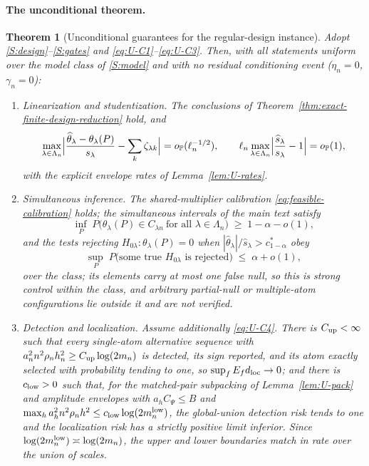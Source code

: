 \documentclass[11pt]{article}
\newtheorem{theorem}{Theorem}[section]
\theoremstyle{definition}
\newcommand{\1}{\mathbf 1}\newcommand{\op}{\operatorname}
\begin{document}
\paragraph{The unconditional theorem.}

\begin{theorem}[Unconditional guarantees for the regular-design instance]
\label{thm:U-unconditional}
Adopt \ref{S:design}--\ref{S:gates} and \eqref{eq:U-C1}--\eqref{eq:U-C3}.
Then, with all statements uniform over the model class of \ref{S:model} and
with no residual conditioning event ($\eta_n=0$, $\gamma_n=0$):
\begin{enumerate}[label=\textup{(\alph*)},leftmargin=2em,itemsep=3pt]
\item\emph{Linearization and studentization.}  The conclusions of
Theorem~\ref{thm:exact-finite-design-reduction} hold, and
\[
\max_{\lambda\in\Lambda_n}
\Bigl|\frac{\widehat\theta_\lambda-\theta_\lambda(P)}{s_\lambda}
-\sum_k\zeta_{\lambda k}\Bigr|
=o_{\mathbb P}(\ell_n^{-1/2}),
\qquad
\ell_n\max_{\lambda\in\Lambda_n}
\Bigl|\frac{\widehat s_\lambda}{s_\lambda}-1\Bigr|
=o_{\mathbb P}(1),
\]
with the explicit envelope rates of Lemma~\ref{lem:U-rates}.
\item\emph{Simultaneous inference.}  The shared-multiplier calibration
\eqref{eq:feasible-calibration} holds; the simultaneous intervals of the main text satisfy
\[
\inf_{P}\;
P\bigl(\theta_\lambda(P)\in C_{\lambda n}\ \text{for all }
\lambda\in\Lambda_n\bigr)\;\ge\;1-\alpha-o(1),
\]
and the tests rejecting $H_{0\lambda}:\theta_\lambda(P)=0$ when
$|\widehat\theta_\lambda|/\widehat s_\lambda>c^*_{1-\alpha}$ obey
\[
\sup_{P}\;
P\bigl(\text{some true }H_{0\lambda}\text{ is rejected}\bigr)
\;\le\;\alpha+o(1),
\]
over the class; its elements carry at most one false null, so this is strong
control within the class, and arbitrary partial-null or multiple-atom
configurations lie outside it and are not verified.
\item\emph{Detection and localization.}  Assume additionally
\eqref{eq:U-C4}.  There is $C_{\rm up}<\infty$ such that every single-atom
alternative sequence with
$a_n^2n^2\rho_nh_n^2\ge C_{\rm up}\log(2m_n)$ is detected, its sign reported,
and its atom exactly selected with probability tending to one, so
$\sup_fE_fd_{\rm loc}\to0$; and there is $c_{\rm low}>0$ such that, for the
matched-pair subpacking of Lemma~\ref{lem:U-pack} and amplitude envelopes with
$a_hC_\Psi\le B$ and
$\max_ha_h^2n^2\rho_nh^2\le c_{\rm low}\log(2m_n^{\rm low})$, the global-union
detection risk tends to one and the localization risk has a strictly positive
limit inferior.  Since
$\log(2m_n^{\rm low})\asymp\log(2m_n)$, the upper and lower boundaries match in
rate over the union of scales.
\end{enumerate}
\end{theorem}
\end{document}
